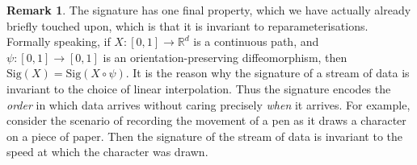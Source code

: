 \documentclass{article}
\theoremstyle{plain}
\theoremstyle{definition}
\newtheorem{remark}[thm]{Remark}
\begin{document}
\begin{remark}
	The signature has one final property, which we have actually already briefly touched upon, which is that it is invariant to reparameterisations. Formally speaking, if $X \colon [0, 1] \to \mathbb R^d$ is a continuous path, and $\psi \colon [0, 1] \to [0, 1]$ is an orientation-preserving diffeomorphism, then $\mathrm{Sig}(X) = \mathrm{Sig}(X \circ \psi)$. It is the reason why the signature of a stream of data is invariant to the choice of linear interpolation. Thus the signature encodes the \emph{order} in which data arrives without caring precisely \emph{when} it arrives. For example, consider the scenario of recording the movement of a pen as it draws a character on a piece of paper. Then the signature of the stream of data is invariant to the speed at which the character was drawn.
\end{remark}
\end{document}
